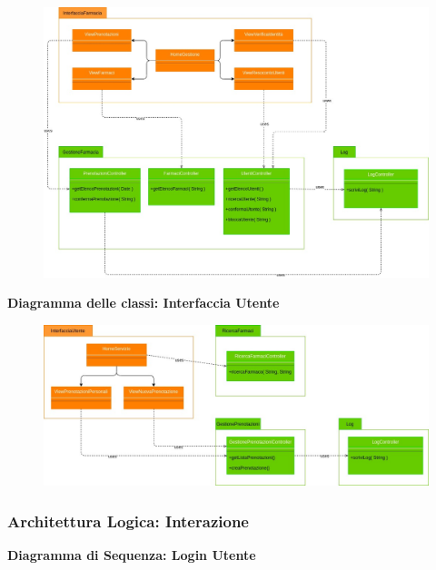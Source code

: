 \begin{figure}[h!]
    \begin{center}
        \includegraphics[width=\textwidth]{immagini/Diagrammi-Farmacia.jpg}
    \end{center}
\end{figure}
\hfill \break

\newpage
\textbf{Diagramma delle classi: Interfaccia Utente}

\begin{figure}[h!]
    \begin{center}
        \includegraphics[width=\textwidth]{immagini/Diagrammi-Utente.jpg}
    \end{center}
\end{figure}
\hfill \break

\newpage
\subsubsection{Architettura Logica: Interazione}
\hfill \break

\textbf{Diagramma di Sequenza: Login Utente}

